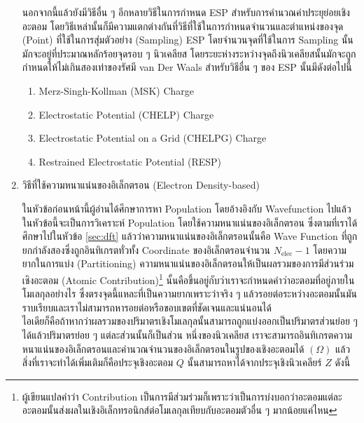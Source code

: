 \begin{enumerate}[topsep=0pt,noitemsep]
          นอกจากนี้แล้วยังมีวิธีอื่น ๆ อีกหลายวิธีในการกำหนด ESP สำหรับการคำนวณค่าประยุย่อยเชิงอะตอม โดยวิธีเหล่านั้นก็มีความแตกต่างกันที่วิธีที่ใช้ในการกำหนดจำนวนและตำแหน่งของจุด (Point) ที่ใช้ในการสุ่มตัวอย่าง (Sampling) ESP โดยจำนวนจุดที่ใช้ในการ Sampling นั้นมักจะอยู่ที่ประมาณหลักร้อยจุดรอบ ๆ นิวเคลียส โดยระยะห่างระหว่างจุดถึงนิวเคลียสนั้นมักจะถูกกำหนดให้ไม่เกินสองเท่าของรัศมี van Der Waals สำหรับวิธีอื่น ๆ ของ ESP นั้นมีดังต่อไปนี้

          \begin{enumerate}[topsep=0pt,noitemsep]\setlength\itemsep{0.5em}
              \item Merz-Singh-Kollman (MSK) Charge\autocite{singh1984}

              \item Electrostatic Potential (CHELP) Charge\autocite{chirlian1987}

              \item Electrostatic Potential on a Grid (CHELPG) Charge\autocite{breneman1990}

              \item Restrained Electrostatic Potential (RESP)\autocite{cornell1993}
          \end{enumerate}

    \item วิธีที่ใช้ความหนาแน่นของอิเล็กตรอน (Electron Density-based)

          ในหัวข้อก่อนหน้านี้ผู้อ่านได้ศึกษาการหา Population โดยอ้างอิงกับ Wavefunction ไปแล้ว ในหัวข้อนี้จะเป็นการวิเคราะห์ Population โดยใช้ความหนาแน่นของอิเล็กตรอน ซึ่งตามที่เราได้ศึกษาไปในหัวข้อ \ref{sec:dft} แล้วว่าความหนาแน่นของอิเล็กตรอนนั้นคือ Wave Function ที่ถูกยกกำลังสองซึ่งถูกอินทิเกรตทั่วทั้ง Coordinate ของอิเล็กตรอนจำนวน $N_{\text{elec}} - 1$ โดยความยากในการแบ่ง (Partitioning) ความหนาแน่นของอิเล็กตรอนให้เป็นผลรวมของการมีส่วนร่วมเชิงอะตอม (Atomic Contribution)\footnote{ผู้เขียนแปลคำว่า Contribution เป็นการมีส่วมร่วมก็เพราะว่าเป็นการบ่งบอกว่าอะตอมแต่ละอะตอมนั้นส่งผลในเชิงอิเล็กทรอนิกส์ต่อโมเลกุลเทียบกับอะตอมตัวอื่น ๆ มากน้อยแค่ไหน} นั้นคือขึ้นอยู่กับว่าเราจะกำหนดคำว่าอะตอมที่อยู่ภายในโมเลกุลอย่างไร ซึ่งตรงจุดนี้แหละที่เป็นความยากเพราะว่าจริง ๆ แล้วรอยต่อระหว่างอะตอมนั้นมันราบเรียบและเราไม่สามารถหารอยต่อหรือขอบเขตที่ชัดเจนและแน่นอนได้ \\
          
          ไอเดียก็คือถ้าหากว่าผลรวมของปริมาตรเชิงโมเลกุลนั้นสามารถถูกแบ่งออกเป็นปริมาตรส่วนย่อย ๆ ได้แล้วปริมาตรย่อย ๆ แต่ละส่วนนั้นก็เป็นส่วน หนึ่งของนิวเคลียส เราจะสามารถอินทิเกรตความหนาแน่นของอิเล็กตรอนและคำนวณจำนวนของอิเล็กตรอนในรูปของเชิงอะตอมได้ $(\Omega)$ แล้วสิ่งที่เราจะทำได้เพิ่มเติมก็คือประจุเชิงอะตอม $Q$ นั้นสามารถหาได้จากประจุเชิงนิวเคลียร์ $Z$ ดังนี้


\end{enumerate}

